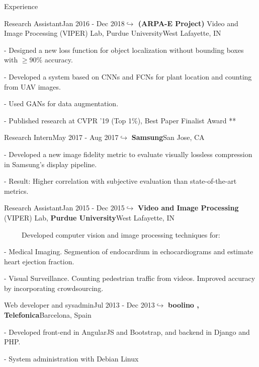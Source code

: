 \documentclass{resume} %
\begin{document}
\begin{rSection}{Experience}
\begin{rSubsection}{Research Assistant}{Jan 2016 - Dec 2018}{\textbf{$\hookrightarrow$ (ARPA-E Project)} Video and Image Processing (VIPER) Lab, Purdue University}{West Lafayette, IN}
\setlength{\itemindent}{.3in}
\item[-] Designed a new loss function for object localization without bounding boxes with $ \ge 90\%$ accuracy.
\item[-] Developed a system based on CNNs and FCNs for plant location and counting from UAV images.
\item[-] Used GANs for data augmentation.
\item[-] Published research at CVPR '19 (Top 1\%), Best Paper Finalist Award **
\end{rSubsection}


\begin{rSubsection}{Research Intern}{May 2017 - Aug 2017}{$\hookrightarrow$ \textbf{Samsung}}{San Jose, CA}
\setlength{\itemindent}{.3in}
\item[-] Developed a new image fidelity metric to evaluate visually lossless compression in Samsung's display pipeline.
\item[-] Result: Higher correlation with subjective evaluation than state-of-the-art metrics.
\end{rSubsection}

\begin{rSubsection}{Research Assistant}{Jan 2015 - Dec 2015}{$\hookrightarrow$ \textbf{Video and Image Processing} (VIPER) Lab, \textbf{Purdue University}}{West Lafayette, IN}
\item[]~~~~~Developed computer vision and image processing techniques for:
\setlength{\itemindent}{.3in}
\item[-] Medical Imaging. Segmention of endocardium in echocardiograms and estimate heart ejection fraction.
\item[-] Visual Surveillance. Counting pedestrian traffic from videos. Improved accuracy by incorporating crowdsourcing.
\end{rSubsection}

\begin{rSubsection}{Web developer and sysadmin}{Jul 2013 - Dec 2013}{$\hookrightarrow$ \textbf{boolino , Telefonica}}{Barcelona, Spain}
\setlength{\itemindent}{.3in}
\item[-] Developed front-end in AngularJS and Bootstrap, and backend in Django and PHP.
\item[-] System administration with Debian Linux
\end{rSubsection}

\vspace{-1pt}

\end{rSection}
\end{document}

